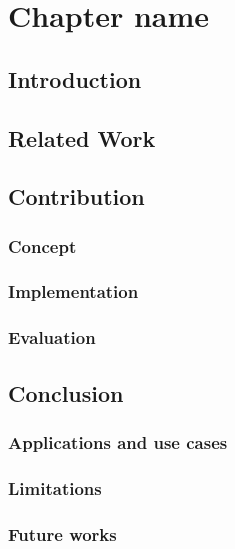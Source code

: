 \chapter{Chapter name}

\section{Introduction}

\section{Related Work}

\section{Contribution}

\subsection{Concept}
\subsection{Implementation}
\subsection{Evaluation}

\section{Conclusion}

\subsection{Applications and use cases}
\subsection{Limitations}
\subsection{Future works}